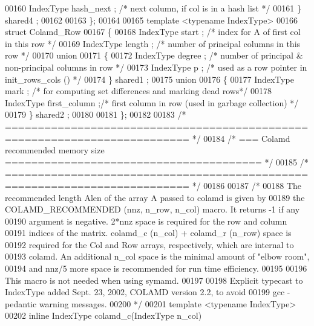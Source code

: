 \begin{DoxyCode}
00160     IndexType hash\_next ;   \textcolor{comment}{/* next column, if col is in a hash list */}
00161   \} shared4 ;
00162   
00163 \};
00164  
00165 \textcolor{keyword}{template} <\textcolor{keyword}{typename} IndexType>
00166 \textcolor{keyword}{struct }Colamd\_Row
00167 \{
00168   IndexType start ;   \textcolor{comment}{/* index for A of first col in this row */}
00169   IndexType length ;  \textcolor{comment}{/* number of principal columns in this row */}
00170   \textcolor{keyword}{union}
00171   \{
00172     IndexType degree ;  \textcolor{comment}{/* number of principal & non-principal columns in row */}
00173     IndexType p ;   \textcolor{comment}{/* used as a row pointer in init\_rows\_cols () */}
00174   \} shared1 ;
00175   \textcolor{keyword}{union}
00176   \{
00177     IndexType mark ;  \textcolor{comment}{/* for computing set differences and marking dead rows*/}
00178     IndexType first\_column ;\textcolor{comment}{/* first column in row (used in garbage collection) */}
00179   \} shared2 ;
00180   
00181 \};
00182  
00183 \textcolor{comment}{/* ========================================================================== */}
00184 \textcolor{comment}{/* === Colamd recommended memory size ======================================= */}
00185 \textcolor{comment}{/* ========================================================================== */}
00186  
00187 \textcolor{comment}{/*}
00188 \textcolor{comment}{  The recommended length Alen of the array A passed to colamd is given by}
00189 \textcolor{comment}{  the COLAMD\_RECOMMENDED (nnz, n\_row, n\_col) macro.  It returns -1 if any}
00190 \textcolor{comment}{  argument is negative.  2*nnz space is required for the row and column}
00191 \textcolor{comment}{  indices of the matrix. colamd\_c (n\_col) + colamd\_r (n\_row) space is}
00192 \textcolor{comment}{  required for the Col and Row arrays, respectively, which are internal to}
00193 \textcolor{comment}{  colamd.  An additional n\_col space is the minimal amount of "elbow room",}
00194 \textcolor{comment}{  and nnz/5 more space is recommended for run time efficiency.}
00195 \textcolor{comment}{  }
00196 \textcolor{comment}{  This macro is not needed when using symamd.}
00197 \textcolor{comment}{  }
00198 \textcolor{comment}{  Explicit typecast to IndexType added Sept. 23, 2002, COLAMD version 2.2, to avoid}
00199 \textcolor{comment}{  gcc -pedantic warning messages.}
00200 \textcolor{comment}{*/}
00201 \textcolor{keyword}{template} <\textcolor{keyword}{typename} IndexType>
00202 \textcolor{keyword}{inline} IndexType colamd\_c(IndexType n\_col) 

\end{DoxyCode}
